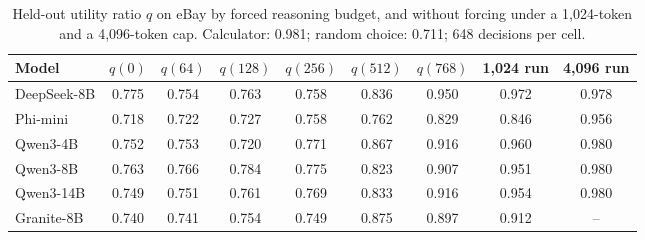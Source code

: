 \begin{table}[t]
\caption{Held-out utility ratio $q$ on eBay by forced reasoning budget, and without forcing under a 1,024-token and a 4,096-token cap. Calculator: 0.981; random choice: 0.711; 648 decisions per cell.}
\label{tab:qbudget}
\small
\centering

\begin{tabular}{lcccccccc}
\toprule
Model & $q(0)$ & $q(64)$ & $q(128)$ & $q(256)$ & $q(512)$ & $q(768)$ & 1,024 run & 4,096 run \\
\midrule
DeepSeek-8B & 0.775 & 0.754 & 0.763 & 0.758 & 0.836 & 0.950 & 0.972 & 0.978 \\
Phi-mini & 0.718 & 0.722 & 0.727 & 0.758 & 0.762 & 0.829 & 0.846 & 0.956 \\
Qwen3-4B & 0.752 & 0.753 & 0.720 & 0.771 & 0.867 & 0.916 & 0.960 & 0.980 \\
Qwen3-8B & 0.763 & 0.766 & 0.784 & 0.775 & 0.823 & 0.907 & 0.951 & 0.980 \\
Qwen3-14B & 0.749 & 0.751 & 0.761 & 0.769 & 0.833 & 0.916 & 0.954 & 0.980 \\
Granite-8B & 0.740 & 0.741 & 0.754 & 0.749 & 0.875 & 0.897 & 0.912 & -- \\
\bottomrule
\end{tabular}
\end{table}
